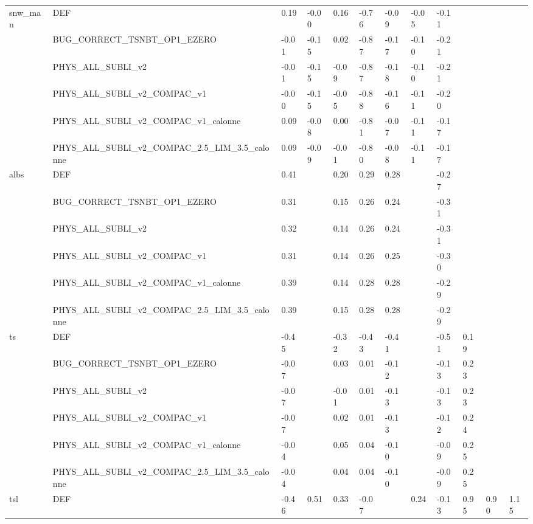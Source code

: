 \begin{tabular}{llllllllllll}
\cline{1-12}
\multirow[t]{6}{*}{snw_man} & DEF & 0.19 & -0.00 & 0.16 & -0.76 & -0.09 & -0.05 & -0.11 &  &  &  \\
 & BUG_CORRECT_TSNBT_OP1_EZERO & -0.01 & -0.15 & 0.02 & -0.87 & -0.17 & -0.10 & -0.21 &  &  &  \\
 & PHYS_ALL_SUBLI_v2 & -0.01 & -0.15 & -0.09 & -0.87 & -0.18 & -0.10 & -0.21 &  &  &  \\
 & PHYS_ALL_SUBLI_v2_COMPAC_v1 & -0.00 & -0.15 & -0.05 & -0.88 & -0.16 & -0.11 & -0.20 &  &  &  \\
 & PHYS_ALL_SUBLI_v2_COMPAC_v1_calonne & 0.09 & -0.08 & 0.00 & -0.81 & -0.07 & -0.11 & -0.17 &  &  &  \\
 & PHYS_ALL_SUBLI_v2_COMPAC_2.5_LIM_3.5_calonne & 0.09 & -0.09 & -0.01 & -0.80 & -0.08 & -0.11 & -0.17 &  &  &  \\
\cline{1-12}
\multirow[t]{6}{*}{albs} & DEF & 0.41 &  & 0.20 & 0.29 & 0.28 &  & -0.27 &  &  &  \\
 & BUG_CORRECT_TSNBT_OP1_EZERO & 0.31 &  & 0.15 & 0.26 & 0.24 &  & -0.31 &  &  &  \\
 & PHYS_ALL_SUBLI_v2 & 0.32 &  & 0.14 & 0.26 & 0.24 &  & -0.31 &  &  &  \\
 & PHYS_ALL_SUBLI_v2_COMPAC_v1 & 0.31 &  & 0.14 & 0.26 & 0.25 &  & -0.30 &  &  &  \\
 & PHYS_ALL_SUBLI_v2_COMPAC_v1_calonne & 0.39 &  & 0.14 & 0.28 & 0.28 &  & -0.29 &  &  &  \\
 & PHYS_ALL_SUBLI_v2_COMPAC_2.5_LIM_3.5_calonne & 0.39 &  & 0.15 & 0.28 & 0.28 &  & -0.29 &  &  &  \\
\cline{1-12}
\multirow[t]{6}{*}{ts} & DEF & -0.45 &  & -0.32 & -0.43 & -0.41 &  & -0.51 & 0.19 &  &  \\
 & BUG_CORRECT_TSNBT_OP1_EZERO & -0.07 &  & 0.03 & 0.01 & -0.12 &  & -0.13 & 0.23 &  &  \\
 & PHYS_ALL_SUBLI_v2 & -0.07 &  & -0.01 & 0.01 & -0.13 &  & -0.13 & 0.23 &  &  \\
 & PHYS_ALL_SUBLI_v2_COMPAC_v1 & -0.07 &  & 0.02 & 0.01 & -0.13 &  & -0.12 & 0.24 &  &  \\
 & PHYS_ALL_SUBLI_v2_COMPAC_v1_calonne & -0.04 &  & 0.05 & 0.04 & -0.10 &  & -0.09 & 0.25 &  &  \\
 & PHYS_ALL_SUBLI_v2_COMPAC_2.5_LIM_3.5_calonne & -0.04 &  & 0.04 & 0.04 & -0.10 &  & -0.09 & 0.25 &  &  \\
\cline{1-12}
\multirow[t]{6}{*}{tsl} & DEF & -0.46 & 0.51 & 0.33 & -0.07 &  & 0.24 & -0.13 & 0.95 & 0.90 & 1.15 \\

\end{tabular}
